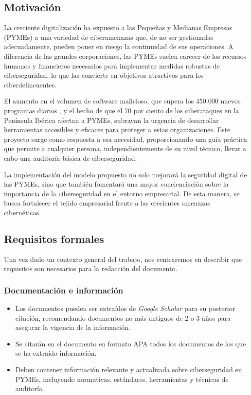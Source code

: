\documentclass[a4paper, 10pt]{article}
\begin{document}
\subsection{Motivación}
La creciente digitalización ha expuesto a las Pequeñas y Medianas Empresas (PYMEs) a una variedad de ciberamenazas que, de no ser gestionadas adecuadamente, pueden poner en riesgo la continuidad de sus operaciones. A diferencia de las grandes corporaciones, las PYMEs suelen carecer de los recursos humanos y financieros necesarios para implementar medidas robustas de ciberseguridad, lo que las convierte en objetivos atractivos para los ciberdelincuentes.
\par\vspace{0.5cm}
El aumento en el volumen de software malicioso, que supera los 450.000 nuevos programas diarios \cite{avtest}, y el hecho de que el 70 por ciento de los ciberataques en la Península Ibérica afectan a PYMEs, subrayan la urgencia de desarrollar herramientas accesibles y eficaces para proteger a estas organizaciones. Este proyecto surge como respuesta a esa necesidad, proporcionando una guía práctica que permite a cualquier persona, independientemente de su nivel técnico, llevar a cabo una auditoría básica de ciberseguridad.
\par\vspace{0.5cm}

La implementación del modelo propuesto no solo mejorará la seguridad digital de las PYMEs, sino que también fomentará una mayor concienciación sobre la importancia de la ciberseguridad en el entorno empresarial. De esta manera, se busca fortalecer el tejido empresarial frente a las crecientes amenazas cibernéticas.


\subsection{Requisitos formales}
Una vez dado un contexto general del trabajo, nos centraremos en describir que requisitos son necesarios para la redacción
 del documento.
\subsubsection{Documentación e información}
\begin{itemize}
    \item Los documentos pueden ser extraídos de \textit{Google Scholar} para su posterior citación, recomendando documentos no más antiguos de 2 o 3 años para asegurar la vigencia de la información.
    \item Se citarán en el documento en formato APA todos los documentos de los que se ha extraído información.
    \item Deben contener información relevante y actualizada sobre ciberseguridad en PYMEs, incluyendo normativas, estándares, herramientas y técnicas de auditoría.
\end{itemize}
\end{document}
